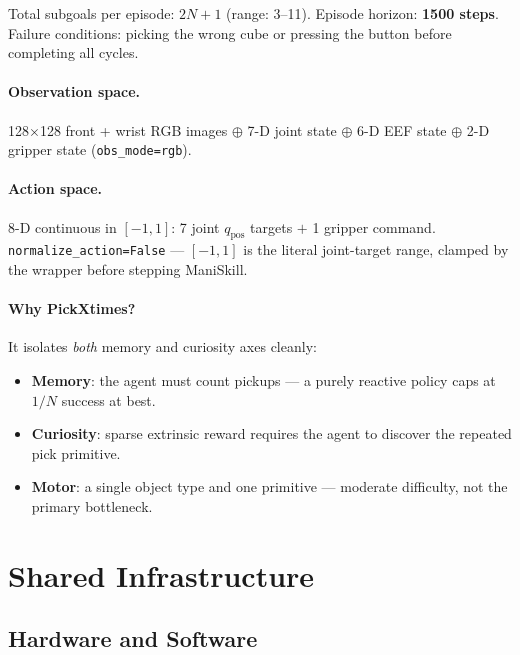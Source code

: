 \documentclass[11pt,letterpaper]{article}
\begin{document}
Total subgoals per episode: $2N + 1$ (range: 3–11).
Episode horizon: \textbf{1500 steps}.
Failure conditions: picking the wrong cube or pressing the button before completing
all cycles.

\paragraph{Observation space.}
128$\times$128 front + wrist RGB images $\oplus$ 7-D joint state $\oplus$ 6-D EEF
state $\oplus$ 2-D gripper state (\texttt{obs\_mode=rgb}).

\paragraph{Action space.}
8-D continuous in $[-1, 1]$: 7 joint $q_\text{pos}$ targets $+$ 1 gripper command.
\texttt{normalize\_action=False} — $[-1, 1]$ is the literal joint-target range,
clamped by the wrapper before stepping ManiSkill.

\paragraph{Why PickXtimes?}
It isolates \emph{both} memory and curiosity axes cleanly:
\begin{itemize}[nosep]
  \item \textbf{Memory}: the agent must count pickups — a purely reactive policy
        caps at $1/N$ success at best.
  \item \textbf{Curiosity}: sparse extrinsic reward requires the agent to discover
        the repeated pick primitive.
  \item \textbf{Motor}: a single object type and one primitive — moderate difficulty,
        not the primary bottleneck.
\end{itemize}

\section{Shared Infrastructure}

\subsection{Hardware and Software}
\end{document}
